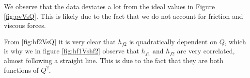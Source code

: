 We observe that the data deviates a lot from the ideal values in Figure \ref{fig:pvVsQ}. This is likely due to the fact that we do not account for friction and viscous forces.

From \ref{fig:hf2VsQ} it is very clear that $h_{f2}$ is quadratically dependent on $Q$, which is why we in figure \ref{fig:hf1Vshf2} observe that $h_{f1}$ and $h_{f2}$ are very correlated, almost following a straight line. This is due to the fact that they are both functions of $Q^2$.

